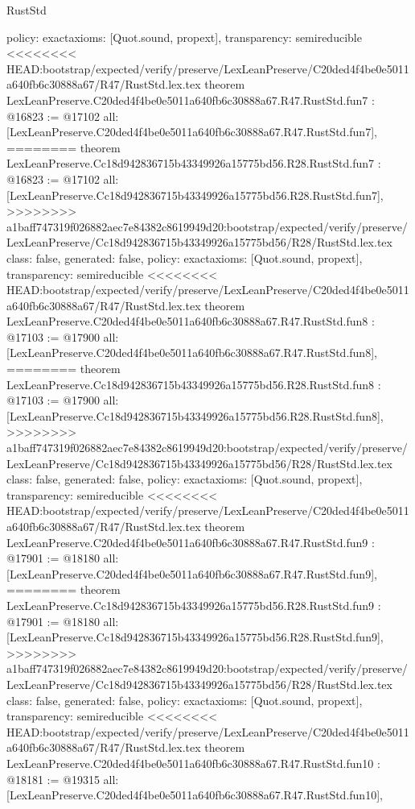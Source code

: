 \begin{lexlean}{RustStd}
\begin{coremodule}
{\begin{coremodule}
{{{{{{{{{{  policy: exact{axioms: [Quot.sound, propext]},
  transparency: semireducible
}
<<<<<<<< HEAD:bootstrap/expected/verify/preserve/LexLeanPreserve/C20ded4f4be0e5011a640fb6c30888a67/R47/RustStd.lex.tex
theorem LexLeanPreserve.C20ded4f4be0e5011a640fb6c30888a67.R47.RustStd.fun7 : @16823 := @17102 {
  all: [LexLeanPreserve.C20ded4f4be0e5011a640fb6c30888a67.R47.RustStd.fun7],
========
theorem LexLeanPreserve.Cc18d942836715b43349926a15775bd56.R28.RustStd.fun7 : @16823 := @17102 {
  all: [LexLeanPreserve.Cc18d942836715b43349926a15775bd56.R28.RustStd.fun7],
>>>>>>>> a1baff747319f026882aec7e84382c8619949d20:bootstrap/expected/verify/preserve/LexLeanPreserve/Cc18d942836715b43349926a15775bd56/R28/RustStd.lex.tex
  class: false,
  generated: false,
  policy: exact{axioms: [Quot.sound, propext]},
  transparency: semireducible
}
<<<<<<<< HEAD:bootstrap/expected/verify/preserve/LexLeanPreserve/C20ded4f4be0e5011a640fb6c30888a67/R47/RustStd.lex.tex
theorem LexLeanPreserve.C20ded4f4be0e5011a640fb6c30888a67.R47.RustStd.fun8 : @17103 := @17900 {
  all: [LexLeanPreserve.C20ded4f4be0e5011a640fb6c30888a67.R47.RustStd.fun8],
========
theorem LexLeanPreserve.Cc18d942836715b43349926a15775bd56.R28.RustStd.fun8 : @17103 := @17900 {
  all: [LexLeanPreserve.Cc18d942836715b43349926a15775bd56.R28.RustStd.fun8],
>>>>>>>> a1baff747319f026882aec7e84382c8619949d20:bootstrap/expected/verify/preserve/LexLeanPreserve/Cc18d942836715b43349926a15775bd56/R28/RustStd.lex.tex
  class: false,
  generated: false,
  policy: exact{axioms: [Quot.sound, propext]},
  transparency: semireducible
}
<<<<<<<< HEAD:bootstrap/expected/verify/preserve/LexLeanPreserve/C20ded4f4be0e5011a640fb6c30888a67/R47/RustStd.lex.tex
theorem LexLeanPreserve.C20ded4f4be0e5011a640fb6c30888a67.R47.RustStd.fun9 : @17901 := @18180 {
  all: [LexLeanPreserve.C20ded4f4be0e5011a640fb6c30888a67.R47.RustStd.fun9],
========
theorem LexLeanPreserve.Cc18d942836715b43349926a15775bd56.R28.RustStd.fun9 : @17901 := @18180 {
  all: [LexLeanPreserve.Cc18d942836715b43349926a15775bd56.R28.RustStd.fun9],
>>>>>>>> a1baff747319f026882aec7e84382c8619949d20:bootstrap/expected/verify/preserve/LexLeanPreserve/Cc18d942836715b43349926a15775bd56/R28/RustStd.lex.tex
  class: false,
  generated: false,
  policy: exact{axioms: [Quot.sound, propext]},
  transparency: semireducible
}
<<<<<<<< HEAD:bootstrap/expected/verify/preserve/LexLeanPreserve/C20ded4f4be0e5011a640fb6c30888a67/R47/RustStd.lex.tex
theorem LexLeanPreserve.C20ded4f4be0e5011a640fb6c30888a67.R47.RustStd.fun10 : @18181 := @19315 {
  all: [LexLeanPreserve.C20ded4f4be0e5011a640fb6c30888a67.R47.RustStd.fun10],
}}}}}}}}}}}}}
\end{coremodule}}
\end{coremodule}
\end{lexlean}
